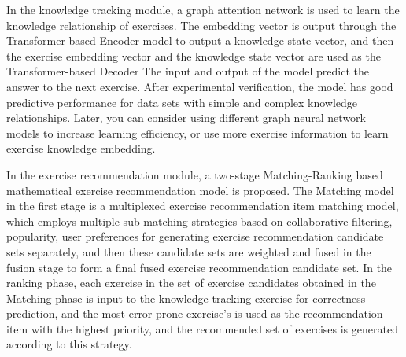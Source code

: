 
In the knowledge tracking module, a graph attention network is used to learn the knowledge relationship of exercises. The embedding vector is output through the Transformer-based Encoder model to output a knowledge state vector, and then the exercise embedding vector and the knowledge state vector are used as the Transformer-based Decoder The input and output of the model predict the answer to the next exercise. After experimental verification, the model has good predictive performance for data sets with simple and complex knowledge relationships. Later, you can consider using different graph neural network models to increase learning efficiency, or use more exercise information to learn exercise knowledge embedding.


In the exercise recommendation module, a two-stage Matching-Ranking based mathematical exercise recommendation model is proposed. The Matching model in the first stage is a multiplexed exercise recommendation item matching model, which employs multiple sub-matching strategies based on collaborative filtering, popularity, user preferences for generating exercise recommendation candidate sets separately, and then these candidate sets are weighted and fused in the fusion stage to form a final fused exercise recommendation candidate set. In the ranking phase, each exercise in the set of exercise candidates obtained in the Matching phase is input to the knowledge tracking exercise for correctness prediction, and the most error-prone exercise's is used as the recommendation item with the highest priority, and the recommended set of exercises is generated according to this strategy.

